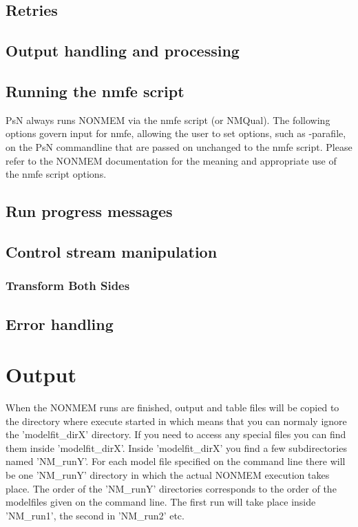 \subsection{Retries}


\subsection{Output handling and processing}


\subsection{Running the nmfe script}
PsN always runs NONMEM via the nmfe script (or NMQual). 
The following options govern input for
nmfe, allowing the user to set options, such as -parafile, on the PsN commandline that
are passed on unchanged to the nmfe script.
Please refer to the NONMEM documentation for the meaning and appropriate use
of the nmfe script options.


\subsection{Run progress messages}


\subsection{Control stream manipulation}

\subsubsection{Transform Both Sides}


\subsection{Error handling}


\section{Output}
When the NONMEM runs are finished, output and table files will be copied to the directory where execute started in which means that you can normaly ignore the 'modelfit\_dirX' directory. If you need to access any special files you can find them inside 'modelfit\_dirX'. Inside 'modelfit\_dirX' you find a few subdirectories named 'NM\_runY'. For each model file specified on the command line there will be one 'NM\_runY' directory in which the actual NONMEM execution takes place. The order of the 'NM\_runY' directories corresponds to the order of the modelfiles given on the command line. The first run will take place inside 'NM\_run1', the second in 'NM\_run2' etc.




